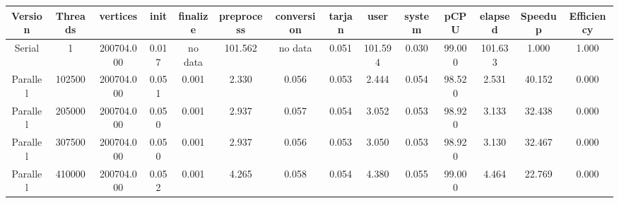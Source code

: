 \begin{tabular}{|c|c|c|c|c|c|c|c|c|c|c|c|c|c|}
\toprule
 Version &  Threads &   vertices &  init & finalize &  preprocess & conversion &  tarjan &    user &  system &   pCPU &  elapsed &  Speedup &  Efficiency \\
\midrule
  Serial &        1 & 200704.000 & 0.017 &  no data &     101.562 &    no data &   0.051 & 101.594 &   0.030 & 99.000 &  101.633 &    1.000 &       1.000 \\
Parallel &   102500 & 200704.000 & 0.051 &    0.001 &       2.330 &      0.056 &   0.053 &   2.444 &   0.054 & 98.520 &    2.531 &   40.152 &       0.000 \\
Parallel &   205000 & 200704.000 & 0.050 &    0.001 &       2.937 &      0.057 &   0.054 &   3.052 &   0.053 & 98.920 &    3.133 &   32.438 &       0.000 \\
Parallel &   307500 & 200704.000 & 0.050 &    0.001 &       2.937 &      0.056 &   0.053 &   3.050 &   0.053 & 98.920 &    3.130 &   32.467 &       0.000 \\
Parallel &   410000 & 200704.000 & 0.052 &    0.001 &       4.265 &      0.058 &   0.054 &   4.380 &   0.055 & 99.000 &    4.464 &   22.769 &       0.000 \\
\bottomrule
\end{tabular}
